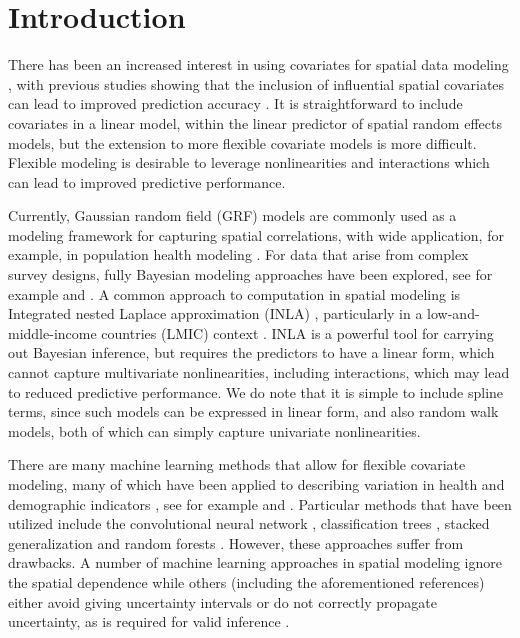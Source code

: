 \documentclass[preprint,12pt,authoryear]{elsarticle}
\begin{document}
\section{Introduction}

There has been an increased interest in using covariates for spatial data modeling \citep{uwiringiyimana2022bayesian, macharia2019sub}, with previous studies showing that the inclusion of influential spatial covariates can lead to improved prediction accuracy \citep{lindstrom2014flexible, ZERAATPISHEH2022105723}. It is straightforward to include covariates in a linear model, within the linear predictor of spatial random effects models, but the extension to more flexible covariate models is more difficult. Flexible modeling is desirable to leverage nonlinearities and interactions which can lead to improved predictive performance.


Currently, Gaussian random field (GRF) models are commonly used as a modeling framework for capturing spatial correlations, with wide application, for example, in population health modeling \citep{diggle2019model}. {For data that arise from complex survey designs, fully Bayesian modeling approaches have been explored, see for example \cite{chan2020bayesian, banerjee2024finite} and \cite{finley2024models}.} A common approach to computation in spatial modeling is Integrated nested Laplace approximation (INLA) \citep{rue2009approximate}, particularly in a low-and-middle-income countries (LMIC) context \citep{utazi2018high, burstein2019mapping}. INLA is a powerful tool for carrying out Bayesian inference, but requires the predictors to have a linear form, which cannot capture multivariate nonlinearities, including  interactions, which may lead to reduced predictive performance. We do note that it is simple to include spline terms, since such models can be expressed in linear form, and also random walk models, both of which can simply capture univariate nonlinearities.

{There are many machine learning methods that allow for flexible covariate modeling, many of which have been applied to describing 
variation in health and demographic indicators , see for example \cite{bosco2017exploring} and \cite{burke2021using}. Particular methods that have been utilized include the convolutional neural network \citep{jean2016combining}, classification trees \citep{bilton2017classification}, stacked generalization \citep{davies2016optimal, osgood2018mapping} and random forests \citep{ren2018}. However, these approaches suffer from drawbacks. {A number of machine learning approaches in spatial modeling ignore the spatial dependence \citep{georganos2021geographical} while others (including the aforementioned references) either avoid giving uncertainty intervals or do not correctly propagate uncertainty, as is required for valid inference \citep{daw2023reds,wakefield2019estimating}}}. 
\end{document}
